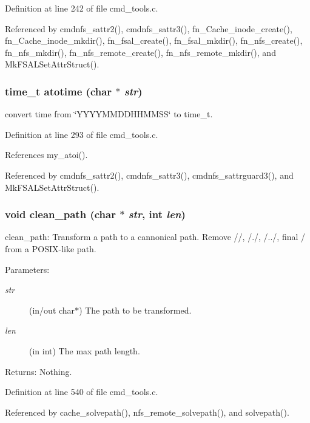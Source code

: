Definition at line 242 of file cmd\_\-tools.c.

Referenced by cmdnfs\_\-sattr2(), cmdnfs\_\-sattr3(), fn\_\-Cache\_\-inode\_\-create(), fn\_\-Cache\_\-inode\_\-mkdir(), fn\_\-fsal\_\-create(), fn\_\-fsal\_\-mkdir(), fn\_\-nfs\_\-create(), fn\_\-nfs\_\-mkdir(), fn\_\-nfs\_\-remote\_\-create(), fn\_\-nfs\_\-remote\_\-mkdir(), and Mk\-FSALSet\-Attr\-Struct().
\subsubsection{\setlength{\rightskip}{0pt plus 5cm}time\_\-t atotime (char $\ast$ {\em str})}\label{cmd__tools_8c_a9}


convert time from \char`\"{}YYYYMMDDHHMMSS\char`\"{} to time\_\-t. 

Definition at line 293 of file cmd\_\-tools.c.

References my\_\-atoi().

Referenced by cmdnfs\_\-sattr2(), cmdnfs\_\-sattr3(), cmdnfs\_\-sattrguard3(), and Mk\-FSALSet\-Attr\-Struct().
\subsubsection{\setlength{\rightskip}{0pt plus 5cm}void clean\_\-path (char $\ast$ {\em str}, int {\em len})}\label{cmd__tools_8c_a12}


clean\_\-path: Transform a path to a cannonical path. Remove //, /./, /../, final / from a POSIX-like path.

\begin{Desc}
\item[Parameters:]
\begin{description}
\item[{\em str}](in/out char$\ast$) The path to be transformed. \item[{\em len}](in int) The max path length. \end{description}
\end{Desc}
\begin{Desc}
\item[Returns:]Nothing. \end{Desc}


Definition at line 540 of file cmd\_\-tools.c.

Referenced by cache\_\-solvepath(), nfs\_\-remote\_\-solvepath(), and solvepath().
